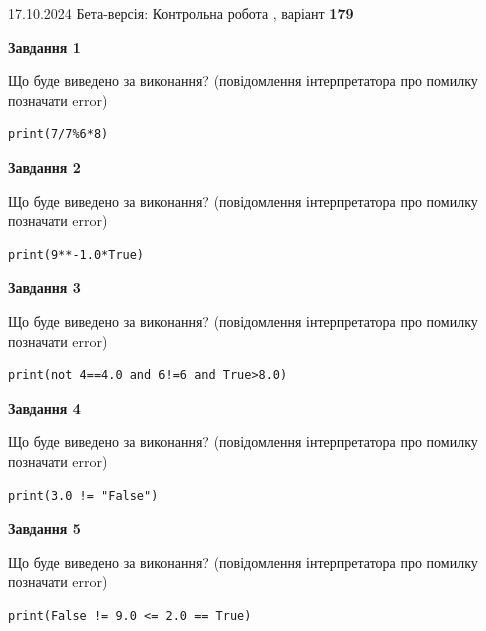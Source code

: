 \documentclass[12pt, ukrainian]{article}
\begin{document}
{\Large{17.10.2024 Бета-версія: Контрольна робота , варіант  \No \textbf { 179 }\par}}
{
\begin {large}
{\begin {center}\textbf{Завдання 1}\end {center}}

Що буде виведено за виконання? (повідомлення інтерпретатора про помилку позначати error)\par
\begin{verbatim}
print(7/7%6*8)
\end{verbatim}

{\begin {center}\textbf{Завдання 2}\end {center}}

Що буде виведено за виконання? (повідомлення інтерпретатора про помилку позначати error)\par
\begin{verbatim}
print(9**-1.0*True)
\end{verbatim}

{\begin {center}\textbf{Завдання 3}\end {center}}

Що буде виведено за виконання? (повідомлення інтерпретатора про помилку позначати error)\par
\begin{verbatim}
print(not 4==4.0 and 6!=6 and True>8.0)
\end{verbatim}

{\begin {center}\textbf{Завдання 4}\end {center}}

Що буде виведено за виконання? (повідомлення інтерпретатора про помилку позначати error)\par
\begin{verbatim}
print(3.0 != "False")
\end{verbatim}

{\begin {center}\textbf{Завдання 5}\end {center}}

Що буде виведено за виконання? (повідомлення інтерпретатора про помилку позначати error)\par
\begin{verbatim}
print(False != 9.0 <= 2.0 == True)
\end{verbatim}


\end{large}}
\end{document}
